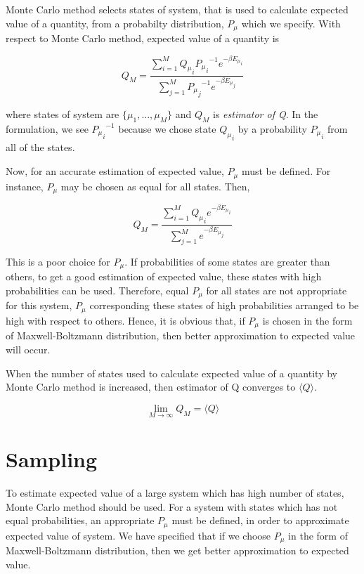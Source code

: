 \documentclass[12pt,fleqn]{report}
\begin{document}
Monte Carlo method selects states of system, that is used to calculate expected value of a quantity, from a probabilty distribution, $P_\mu$ which we specify. With respect to Monte Carlo method, expected value of a quantity is

\begin{equation}
Q_M = \frac{\sum\limits_{i=1}^M {Q_\mu}_i {{P_\mu}_i}^{-1} e^{-\beta {E_\mu}_i}}{\sum\limits_{j=1}^M {{P_\mu}_j}^{-1} e^{-\beta{E_\mu}_j}}
\end{equation}

where states of system are $ \{ \mu_1, ..., \mu_M \} $ and $ Q_M $ is \textit{estimator of Q}. In the formulation, we see $ {{P_\mu}_i}^{-1} $ because we chose state  $ {Q_\mu}_i $ by a probability $ {P_\mu}_i $ from all of the states. 

Now, for an accurate estimation of expected value, $P_\mu$ must be defined. For instance, $P_\mu$ may be chosen as equal for all states. Then,

$$ Q_M = \frac{\sum\limits_{i=1}^M {Q_\mu}_i e^{-\beta {E_\mu}_i}}{\sum\limits_{j=1}^M e^{-\beta {E_\mu}_j}}$$


This is a poor choice for $P_\mu$. If probabilities of some states are greater than others, to get a good estimation of expected value, these states with high probabilities can	 be used. Therefore, equal $P_\mu$ for all states are not appropriate for this system, $P_\mu$ corresponding these states of high probabilities arranged to be high with respect to others. Hence, it is obvious that, if  $P_\mu$ is chosen in the form of Maxwell-Boltzmann distribution, then better approximation to expected value will occur.

When the number of states used to calculate expected value of a quantity by Monte Carlo method is increased, then estimator of Q converges to $\langle Q\rangle$. 

$$
\lim_{M \rightarrow \infty} Q_M = \langle Q \rangle
$$
\section{Sampling} 

To estimate expected value of a large system which has high number of states, Monte Carlo method should be used. For a system with states which has not equal probabilities, an appropriate $P_\mu$ must be defined, in order to approximate expected value of system. We have specified that if we choose $P_\mu$ in the form of Maxwell-Boltzmann distribution, then we get better approximation to expected value.
\end{document}
